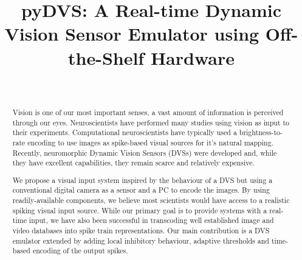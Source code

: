 \documentclass[conference]{IEEEtran}
\begin{document}
\title{pyDVS: A Real-time Dynamic Vision Sensor Emulator using Off-the-Shelf Hardware}
\author{

\\

}


\maketitle
\begin{abstract}
Vision is one of our most important senses, a vast amount of information is perceived through our eyes. Neuroscientists have performed many studies using vision as input to their experiments. Computational neuroscientists have typically used a brightness-to-rate encoding to use images as spike-based visual sources for it's natural mapping. Recently, neuromorphic Dynamic Vision Sensors (DVSs) were developed and, while they have excellent capabilities, they remain scarce and relatively expensive.

We propose a visual input system inspired by the behaviour of a DVS but using a conventional digital camera as a sensor and a PC to encode the images. By using readily-available components, we believe most scientists would have access to a realistic spiking visual input source. While our primary goal is to provide systems with a real-time input, we have also been successful in transcoding well established image and video databases into spike train representations. Our main contribution is a DVS emulator extended by adding  local inhibitory behaviour, adaptive thresholds and time-based encoding of the output spikes.

\end{abstract}
\IEEEpeerreviewmaketitle
\end{document}
